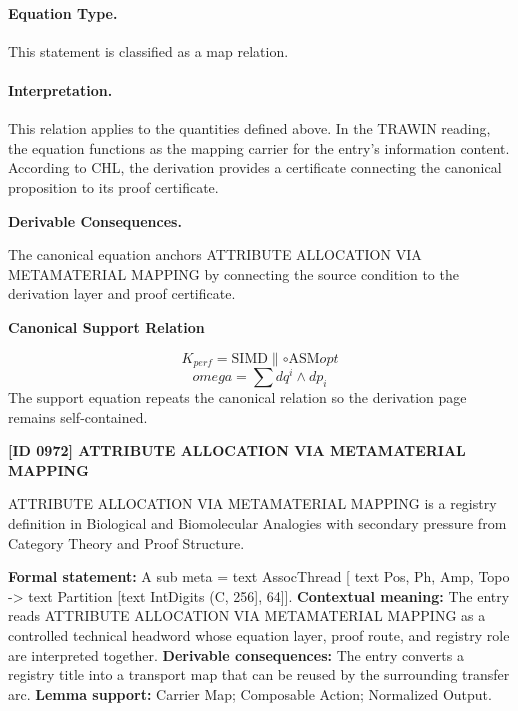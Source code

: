 \paragraph{Equation Type.}
This statement is classified as a map relation.

\paragraph{Interpretation.}
This relation applies to the quantities defined above. In the TRAWIN reading, the equation functions as the mapping carrier for the entry’s information content. According to CHL, the derivation provides a certificate connecting the canonical proposition to its proof certificate.

\par\vspace{0.35em}
\noindent\textbf{Derivable Consequences.}\quad
\begingroup
\footnotesize
\raggedright
The canonical equation anchors ATTRIBUTE ALLOCATION VIA METAMATERIAL MAPPING by connecting the source condition to the derivation layer and proof certificate.
\par\endgroup

\noindent\textbf{Canonical Support Relation}\par
\[
K_{perf} = \text{SIMD} {\parallel} \circ \text{ASM} {opt}
\]
\[
omega = \sum dq^i \wedge dp_i
\]
\noindent The support equation repeats the canonical relation so the derivation page remains self-contained.\par

\clearpage
\noindent\textbf{[ID 0972] ATTRIBUTE ALLOCATION VIA METAMATERIAL MAPPING}\par
\vspace{0.35em}
\begingroup\small
{}
ATTRIBUTE ALLOCATION VIA METAMATERIAL MAPPING is a registry definition in Biological and Biomolecular Analogies with secondary pressure from Category Theory and Proof Structure.

\begingroup\footnotesize\setlength{\emergencystretch}{3em}\sloppy
\textbf{Formal statement:} A sub meta = text AssocThread [ text Pos, Ph, Amp, Topo -> text Partition [text IntDigits (C, 256], 64]]. \textbf{Contextual meaning:} The entry reads ATTRIBUTE ALLOCATION VIA METAMATERIAL MAPPING as a controlled technical headword whose equation layer, proof route, and registry role are interpreted together. \textbf{Derivable consequences:} The entry converts a registry title into a transport map that can be reused by the surrounding transfer arc. \textbf{Lemma support:} Carrier Map; Composable Action; Normalized Output.\par
\endgroup

